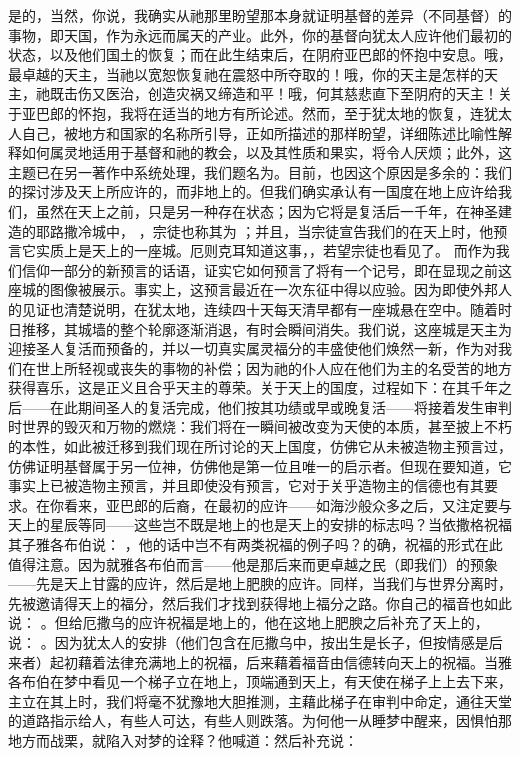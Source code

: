是的，当然，你说，我确实从祂那里盼望那本身就证明基督的差异（不同基督）的事物，即天国，作为永远而属天的产业。此外，你的基督向犹太人应许他们最初的状态，以及他们国土的恢复；而在此生结束后，在阴府亚巴郎的怀抱中安息。哦，最卓越的天主，当祂以宽恕恢复祂在震怒中所夺取的！哦，你的天主是怎样的天主，祂既击伤又医治，创造灾祸又缔造和平！哦，何其慈悲直下至阴府的天主！关于亚巴郎的怀抱，我将在适当的地方有所论述。然而，至于犹太地的恢复，连犹太人自己，被地方和国家的名称所引导，正如所描述的那样盼望，详细陈述比喻性解释如何属灵地适用于基督和祂的教会，以及其性质和果实，将令人厌烦；此外，这主题已在另一著作中系统处理，我们题名为。目前，也因这个原因是多余的：我们的探讨涉及天上所应许的，而非地上的。但我们确实承认有一国度在地上应许给我们，虽然在天上之前，只是另一种存在状态；因为它将是复活后一千年，在神圣建造的耶路撒冷城中， ，宗徒也称其为 ；并且，当宗徒宣告我们的在天上时，他预言它实质上是天上的一座城。厄则克耳知道这事，，若望宗徒也看见了。 而作为我们信仰一部分的新预言的话语，证实它如何预言了将有一个记号，即在显现之前这座城的图像被展示。事实上，这预言最近在一次东征中得以应验。因为即使外邦人的见证也清楚说明，在犹太地，连续四十天每天清早都有一座城悬在空中。随着时日推移，其城墙的整个轮廓逐渐消退，有时会瞬间消失。我们说，这座城是天主为迎接圣人复活而预备的，并以一切真实属灵福分的丰盛使他们焕然一新，作为对我们在世上所轻视或丧失的事物的补偿；因为祂的仆人应在他们为主的名受苦的地方获得喜乐，这是正义且合乎天主的尊荣。关于天上的国度，过程如下：在其千年之后——在此期间圣人的复活完成，他们按其功绩或早或晚复活——将接着发生审判时世界的毁灭和万物的燃烧：我们将在一瞬间被改变为天使的本质，甚至披上不朽的本性，如此被迁移到我们现在所讨论的天上国度，仿佛它从未被造物主预言过，仿佛证明基督属于另一位神，仿佛他是第一位且唯一的启示者。但现在要知道，它事实上已被造物主预言，并且即使没有预言，它对于关乎造物主的信德也有其要求。在你看来，亚巴郎的后裔，在最初的应许——如海沙般众多之后，又注定要与天上的星辰等同——这些岂不既是地上的也是天上的安排的标志吗？当依撒格祝福其子雅各布伯说： ，他的话中岂不有两类祝福的例子吗？的确，祝福的形式在此值得注意。因为就雅各布伯而言——他是那后来而更卓越之民（即我们）的预象——先是天上甘露的应许，然后是地上肥腴的应许。同样，当我们与世界分离时，先被邀请得天上的福分，然后我们才找到获得地上福分之路。你自己的福音也如此说： 。但给厄撒乌的应许祝福是地上的，他在这地上肥腴之后补充了天上的，说： 。因为犹太人的安排（他们包含在厄撒乌中，按出生是长子，但按情感是后来者）起初藉着法律充满地上的祝福，后来藉着福音由信德转向天上的祝福。当雅各布伯在梦中看见一个梯子立在地上，顶端通到天上，有天使在梯子上上去下来，主立在其上时，我们将毫不犹豫地大胆推测，主藉此梯子在审判中命定，通往天堂的道路指示给人，有些人可达，有些人则跌落。为何他一从睡梦中醒来，因惧怕那地方而战栗，就陷入对梦的诠释？他喊道：然后补充说：  